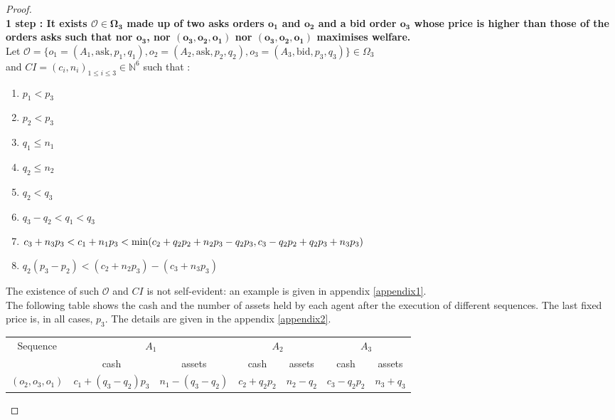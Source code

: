 \documentclass[a4paper]{article}
\newcommand{\N}{\mathbb{N}}
\newcommand{\Oc}{\mathcal{O}}
\newtheorem[style=S, bodystyle=\noindent]{thm}{Theorem}[section]
\newtheorem[style=S, bodystyle=\noindent]{defn}[thm]{Definition}
\newtheorem[style=S, bodystyle=\noindent]{propo}[thm]{Proposition}
\newtheorem[style=S, bodystyle=\noindent]{prop}[thm]{Property}
\newtheorem[style=S, bodystyle=\noindent]{coro}[thm]{Corollary}
\newtheorem[style=S, bodystyle=\noindent]{lem}[thm]{Lemma}
\newtheorem[style=S, headstyle=\bfseries\boldmath Theorem, bodystyle=\noindent]{thm*}{Theorem}
\newtheorem[style=S, headstyle=\bfseries\boldmath Definition, bodystyle=\noindent]{defn*}{Definition}
\newtheorem[style=S, headstyle=\bfseries\boldmath Proposition, bodystyle=\noindent]{propo*}{Proposition}
\newtheorem[style=S, headstyle=\bfseries\boldmath Property, bodystyle=\noindent]{prop*}{Property}
\newtheorem[style=S, headstyle=\bfseries\boldmath Corollary, bodystyle=\noindent]{coro*}{Corollary}
\newtheorem[style=S, headstyle=\bfseries\boldmath Lemma, bodystyle=\noindent]{lem*}{Lemma}
\begin{document}
\begin{proof}
	~\\
	\textbf{1 step : It exists $\boldsymbol{\Oc \in \Omega_3}$ made up of two asks orders $\boldsymbol{o_1}$ and $\boldsymbol{o_2}$ and a bid order $\boldsymbol{o_3}$ whose price is higher than those of the orders asks such that nor $\boldsymbol{o_3}$, nor $\boldsymbol{(o_3, o_2, o_1)}$ nor $\boldsymbol{(o_3, o_2, o_1)}$ maximises welfare.} \\
	Let $\Oc = \{o_1 = (A_1, \text{ask}, p_1, q_1) , o_2 = (A_2, \text{ask}, p_2, q_2), o_3 = (A_3, \text{bid}, p_3, q_3)\} \in \Omega_3$ \\ and $CI = (c_i, n_i)_{1\leq i\leq 3} \in \N^6$ such that :

	\begin{multicols}{2}
	\begin{enumerate}
		\item $p_1 < p_3$
		\item $p_2 < p_3$
		\item $q_1 \leq n_1$
		\item $q_2 \leq n_2$
		\item $q_2 < q_3$
		\item $q_3 - q_2 < q_1 < q_3$
		\item $c_3 + n_3p_3 < c_1 + n_1p_3 \\< \min(c_2 + q_2p_2 + n_2p_3 - q_2p_3,\\c_3 - q_2p_2 + q_2p_3 + n_3p_3)$
		\item $q_2(p_3-p_2) < (c_2 + n_2p_3) - (c_3 + n_3p_3)$\\
	\end{enumerate}
	\end{multicols}
	The existence of such $\Oc$ and $CI$ is not self-evident: an example is given in appendix \ref{appendix1}. \\
	The following table shows the cash and the number of assets held by each agent after the execution of different sequences. The last fixed price is, in all cases, $p_3$. The details are given in the appendix
    \ref{appendix2}. \\
	\begin{center}
	\begin{tabular}{|c|c|c|c|c|c|c|}
		\hline
		\multirow{2}{*}{Sequence} & \multicolumn{2}{c|}{$A_1$} & \multicolumn{2}{c|}{$A_2$} & \multicolumn{2}{c|}{$A_3$} \\
		\cline{2-7}
		& cash & assets & cash & assets & cash & assets \\
		\hline
		\multirow{2}{*}{$(o_2, o_3, o_1)$} & \multirow{2}{*}{$c_1 + (q_3-q_2)p_3$} & \multirow{2}{*}{$n_1 - (q_3-q_2)$} & \multirow{2}{*}{$c_2 + q_2p_2$} & \multirow{2}{*}{$n_2-q_2$} & $c_3 - q_2p_2$ & \multirow{2}{*}{$n_3+q_3$} \\

\end{tabular}
\end{center}
\end{proof}
\end{document}
